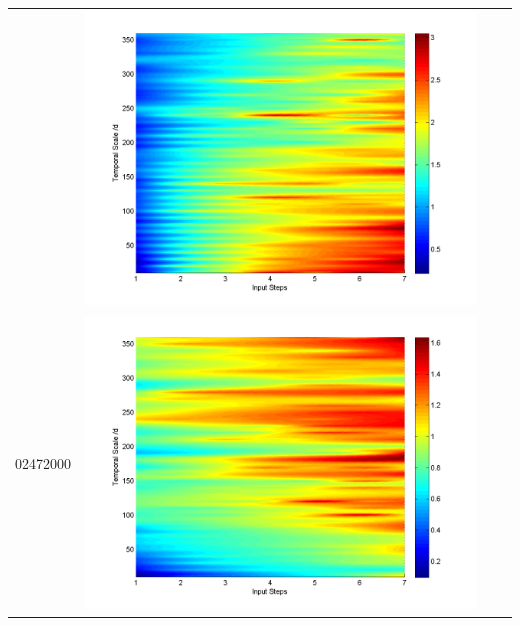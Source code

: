 \documentclass[11pt]{article}
\begin{document}
\begin{table}[H]
{\begin{tabular}{c  c   c   c  }
&\begin{minipage}{.3\textwidth}\includegraphics[width=\linewidth]{resultgraph/02414500pepq.png}\end{minipage}
\\
02472000&\begin{minipage}{.3\textwidth}\includegraphics[width=\linewidth]{resultgraph/02472000p.png}\end{minipage}

\end{tabular}}
\end{table}
\end{document}
